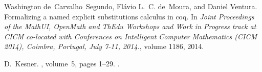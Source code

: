 \documentclass{beamer}
\begin{document}
\begin{frame}
    
\begin{thebibliography}{1}

Washington de~Carvalho~Segundo, Fl{\'{a}}vio L.~C. de~Moura, and Daniel
  Ventura.
\newblock Formalizing a named explicit substitutions calculus in coq.
\newblock In {\em Joint Proceedings of the MathUI, OpenMath and ThEdu Workshops
  and Work in Progress track at {CICM} co-located with Conferences on
  Intelligent Computer Mathematics {(CICM} 2014), Coimbra, Portugal, July 7-11,
  2014.}, volume 1186, 2014.

D.~Kesner.
, volume~5, pages 1--29.
.

\end{thebibliography}
\end{frame}
\end{document}
